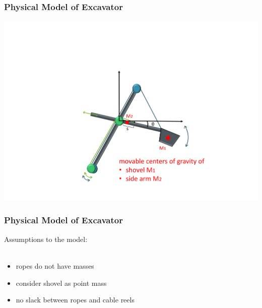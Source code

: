 \begin{frame}
	\frametitle{Physical Model of Excavator}
	
	\includegraphics[trim=22cm 5cm 2cm 23cm, clip=true, width=\linewidth]{img/Excavator_mass2}
	
\end{frame}

\begin{frame}
	\frametitle{Physical Model of Excavator}
	
	
	Assumptions to the model:\\
	$ $ \\
	\begin{itemize}
		\item ropes do not have masses
		\item consider shovel as point mass %
		\item no slack between ropes and cable reels
	\end{itemize}
	
\end{frame}

